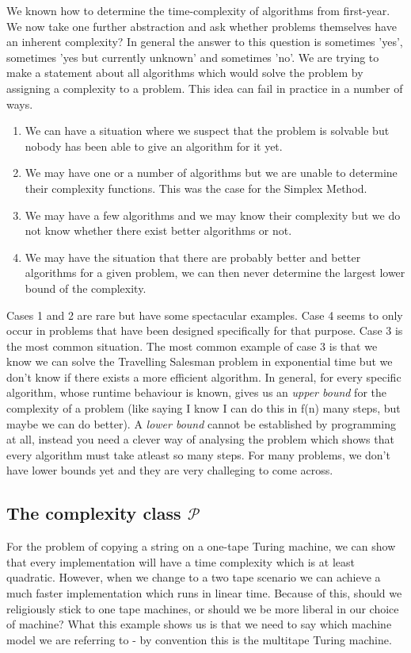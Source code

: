 \documentclass[11pt]{article}
\begin{document}
	\par 
	We known how to determine the time-complexity of algorithms from first-year. We now take one further abstraction and ask whether problems themselves have an inherent complexity? In general the answer to this question is sometimes 'yes', sometimes 'yes but currently unknown' and sometimes 'no'. We are trying to make a statement about all algorithms which would solve the problem by assigning a complexity to a problem. This idea can fail in practice in a number of ways.
	\begin{enumerate}
		\item We can have a situation where we suspect that the problem is solvable but nobody has been able to give an algorithm for it yet.
		\item We may have one or a number of algorithms but we are unable to determine their complexity functions. This was the case for the Simplex Method.
		\item We may have a few algorithms and we may know their complexity but we do not know whether there exist better algorithms or not.
		\item We may have the situation that there are probably better and better algorithms for a given problem, we can then never determine the largest lower bound of the complexity.
	\end{enumerate}
	Cases 1 and 2 are rare but have some spectacular examples. Case 4 seems to only occur in problems that have been designed specifically for that purpose. Case 3 is the most common situation. The most common example of case 3 is that we know we can solve the Travelling Salesman problem in exponential time but we don't know if there exists a more efficient algorithm. In general, for every specific algorithm, whose runtime behaviour is known, gives us an \textit{upper bound} for the complexity of a problem (like saying I know I can do this in f(n) many steps, but maybe we can do better). A \textit{lower bound} cannot be established by programming at all, instead you need a clever way of analysing the problem which shows that every algorithm must take atleast so many steps. For many problems, we don't have lower bounds yet and they are very challeging to come across.
	
	\subsection{The complexity class $\mathcal{P}$}
	For the problem of copying a string on a one-tape Turing machine, we can show that every implementation will have a time complexity which is at least quadratic. However, when we change to a two tape scenario we can achieve a much faster implementation which runs in linear time. Because of this, should we religiously stick to one tape machines, or should we be more liberal in our choice of machine? What this example shows us is that we need to say which machine model we are referring to - by convention this is the multitape Turing machine.
	
\end{document}
